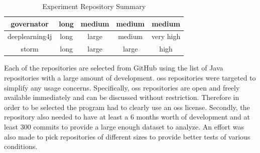 \begin{table}
\begin{center}
\begin{tabular}{|c|c|c|c|c|}
        governator & long & medium & medium & medium \\
        \hline
        deeplearning4j & long & large & medium & very high \\
        \hline
        storm & long & large & large & high \\
        \hline
    \end{tabular}
\end{center}
\caption{Experiment Repository Summary}
\label{tab:repository_size_summary}
\end{table}

Each of the repositories are selected from GitHub using the list of Java repositories with a large amount of development. \gls{oss} repositories were targeted to simplify any usage concerns. Specifically, \gls{oss} repositories are open and freely available immediately and can be discussed without restriction. Therefore in order to be selected the program had to clearly use an \gls{oss} license. Secondly, the repository also needed to have at least a 6 months worth of development and at least 300 commits to provide a large enough dataset to analyze. An effort was also made to pick repositories of different sizes to provide better tests of various conditions.


